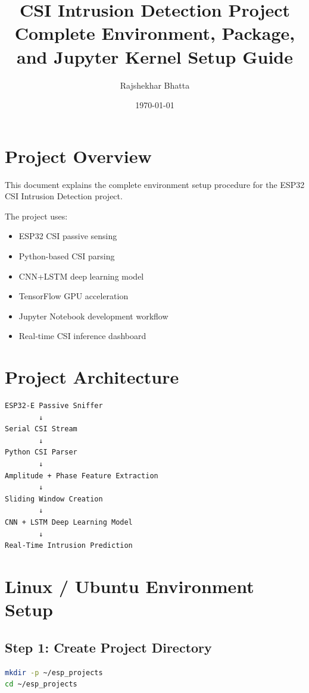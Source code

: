 \documentclass[12pt,a4paper]{article}
\title{\textbf{CSI Intrusion Detection Project\\
Complete Environment, Package, and Jupyter Kernel Setup Guide}}
\author{Rajshekhar Bhatta}
\date{\today}
\begin{document}
\maketitle
\tableofcontents
\newpage

\section{Project Overview}

This document explains the complete environment setup procedure for the ESP32 CSI Intrusion Detection project.

The project uses:

\begin{itemize}
    \item ESP32 CSI passive sensing
    \item Python-based CSI parsing
    \item CNN+LSTM deep learning model
    \item TensorFlow GPU acceleration
    \item Jupyter Notebook development workflow
    \item Real-time CSI inference dashboard
\end{itemize}

\section{Project Architecture}

\begin{verbatim}
ESP32-E Passive Sniffer
        ↓
Serial CSI Stream
        ↓
Python CSI Parser
        ↓
Amplitude + Phase Feature Extraction
        ↓
Sliding Window Creation
        ↓
CNN + LSTM Deep Learning Model
        ↓
Real-Time Intrusion Prediction
\end{verbatim}

\section{Linux / Ubuntu Environment Setup}

\subsection{Step 1: Create Project Directory}

\begin{lstlisting}[language=bash]
mkdir -p ~/esp_projects
cd ~/esp_projects
\end{lstlisting}
\end{document}
